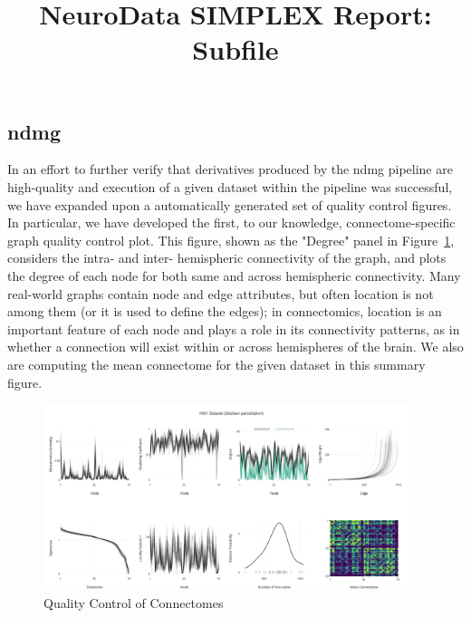 \documentclass[simplex.tex]{subfiles}
\title{NeuroData SIMPLEX Report: Subfile}
\begin{document}


\subsection{ndmg}

In an effort to further verify that derivatives produced by the ndmg pipeline are high-quality and execution of a
given dataset within the pipeline was successful, we have expanded upon a automatically generated set of quality
control figures. In particular, we have developed the first, to our knowledge, connectome-specific graph quality
control plot. This figure, shown as the "Degree" panel in Figure~\ref{fig:ndmgqc}, considers the intra- and inter-
hemispheric connectivity of the graph, and plots the degree of each node for both same and across hemispheric
connectivity. Many real-world graphs contain node and edge attributes, but often location is not among them (or it
is used to define the edges); in connectomics, location is an important feature of each node and plays a role in its
connectivity patterns, as in whether a connection will exist within or across hemispheres of the brain. We also are
computing the mean connectome for the given dataset in this summary figure.

\begin{figure}[h!]
\begin{cframed}
\centering
\includegraphics[width=0.95\textwidth]{../../figs/ndmgqcnew.png}
\caption{Quality Control of Connectomes}
\label{fig:ndmgqc}
\end{cframed}
\end{figure}
\end{document}
